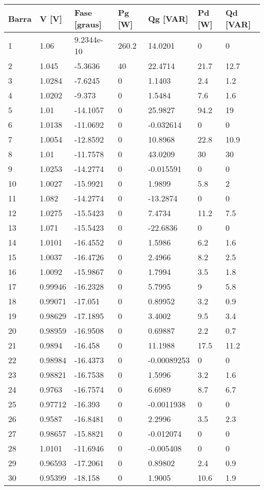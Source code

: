 \begin{tabular}{|l|l|l|l|l|l|l|}
\hline
\textbf{Barra}&\textbf{V [V]}&\textbf{Fase [graus]}&\textbf{Pg [W]}&\textbf{Qg [VAR]}&\textbf{Pd [W]}&\textbf{Qd [VAR]}\\\hline
1&1.06&9.2344e-10&260.2&14.0201&0&0\\\hline
2&1.045&-5.3636&40&22.4714&21.7&12.7\\\hline
3&1.0284&-7.6245&0&1.1403&2.4&1.2\\\hline
4&1.0202&-9.373&0&1.5484&7.6&1.6\\\hline
5&1.01&-14.1057&0&25.9827&94.2&19\\\hline
6&1.0138&-11.0692&0&-0.032614&0&0\\\hline
7&1.0054&-12.8592&0&10.8968&22.8&10.9\\\hline
8&1.01&-11.7578&0&43.0209&30&30\\\hline
9&1.0253&-14.2774&0&-0.015591&0&0\\\hline
10&1.0027&-15.9921&0&1.9899&5.8&2\\\hline
11&1.082&-14.2774&0&-13.2874&0&0\\\hline
12&1.0275&-15.5423&0&7.4734&11.2&7.5\\\hline
13&1.071&-15.5423&0&-22.6836&0&0\\\hline
14&1.0101&-16.4552&0&1.5986&6.2&1.6\\\hline
15&1.0037&-16.4726&0&2.4966&8.2&2.5\\\hline
16&1.0092&-15.9867&0&1.7994&3.5&1.8\\\hline
17&0.99946&-16.2328&0&5.7995&9&5.8\\\hline
18&0.99071&-17.051&0&0.89952&3.2&0.9\\\hline
19&0.98629&-17.1895&0&3.4002&9.5&3.4\\\hline
20&0.98959&-16.9508&0&0.69887&2.2&0.7\\\hline
21&0.9894&-16.458&0&11.1988&17.5&11.2\\\hline
22&0.98984&-16.4373&0&-0.00089253&0&0\\\hline
23&0.98821&-16.7538&0&1.5996&3.2&1.6\\\hline
24&0.9763&-16.7574&0&6.6989&8.7&6.7\\\hline
25&0.97712&-16.393&0&-0.0011938&0&0\\\hline
26&0.9587&-16.8481&0&2.2996&3.5&2.3\\\hline
27&0.98657&-15.8821&0&-0.012074&0&0\\\hline
28&1.0101&-11.6946&0&-0.005408&0&0\\\hline
29&0.96593&-17.2061&0&0.89802&2.4&0.9\\\hline
30&0.95399&-18.158&0&1.9005&10.6&1.9\\\hline
\end{tabular}
